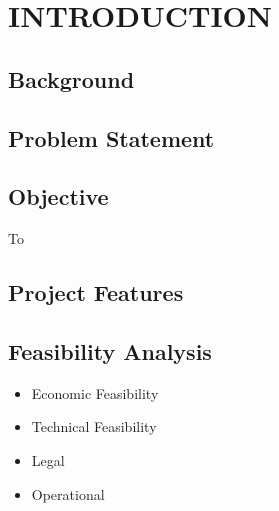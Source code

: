 \newpage
{}
\section{INTRODUCTION}
\subsection{Background}

\blindtext[10]

\clearpage

\subsection{Problem Statement}
\lipsum[1-1]


\clearpage

\subsection{Objective}

To \blindtext[1]

\subsection{Project Features}
\clearpage
\subsection{Feasibility Analysis}

\begin{itemize}
    \item Economic Feasibility
    \item Technical Feasibility
    \item Legal
    \item Operational
\end{itemize}